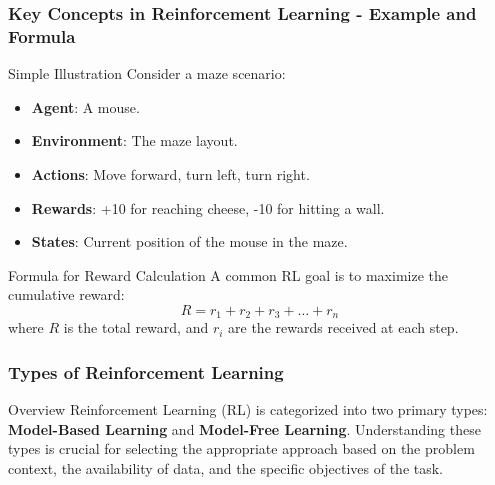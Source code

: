 \documentclass[aspectratio=169]{beamer}
\begin{document}
\begin{frame}[fragile]
    \frametitle{Key Concepts in Reinforcement Learning - Example and Formula}
    \begin{block}{Simple Illustration}
        Consider a maze scenario:
        \begin{itemize}
            \item \textbf{Agent}: A mouse.
            \item \textbf{Environment}: The maze layout.
            \item \textbf{Actions}: Move forward, turn left, turn right.
            \item \textbf{Rewards}: +10 for reaching cheese, -10 for hitting a wall.
            \item \textbf{States}: Current position of the mouse in the maze.
        \end{itemize}
    \end{block}
    \begin{block}{Formula for Reward Calculation}
        A common RL goal is to maximize the cumulative reward:
        \begin{equation}
        R = r_1 + r_2 + r_3 + \ldots + r_n
        \end{equation}
        where \( R \) is the total reward, and \( r_i \) are the rewards received at each step.
    \end{block}
\end{frame}

\begin{frame}[fragile]
    \frametitle{Types of Reinforcement Learning}
    \begin{block}{Overview}
        Reinforcement Learning (RL) is categorized into two primary types: 
        \textbf{Model-Based Learning} and \textbf{Model-Free Learning}. 
        Understanding these types is crucial for selecting the appropriate approach based on the problem context, the availability of data, and the specific objectives of the task.
    \end{block}
\end{frame}
\end{document}
